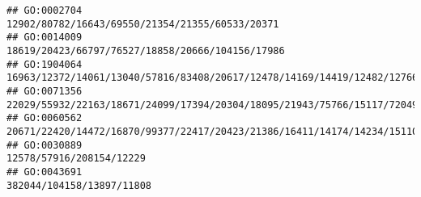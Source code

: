 \documentclass[
]{article}
\begin{document}
\begin{verbatim}
## GO:0002704                                                                                                                                                                                                                                                                                                                                                              12902/80782/16643/69550/21354/21355/60533/20371
## GO:0014009                                                                                                                                                                                                                                                                                                                                                             18619/20423/66797/76527/18858/20666/104156/17986
## GO:1904064                                                                                                                                                                                                                                                                                                                                      16963/12372/14061/13040/57816/83408/20617/12478/14169/14419/12482/12766
## GO:0071356                                                                                                                                                                                                                                                                                                                          22029/55932/22163/18671/24099/17394/20304/18095/21943/75766/15117/72049/15511/13078
## GO:0060562                                                                                                                                                                                                                                                                         20671/22420/14472/16870/99377/22417/20423/21386/16411/14174/14234/15110/20474/65256/17702/14165/18095/22337/21380/104156/19876/12705
## GO:0030889                                                                                                                                                                                                                                                                                                                                                                                     12578/57916/208154/12229
## GO:0043691                                                                                                                                                                                                                                                                                                                                                                                    382044/104158/13897/11808

\end{verbatim}
\end{document}
